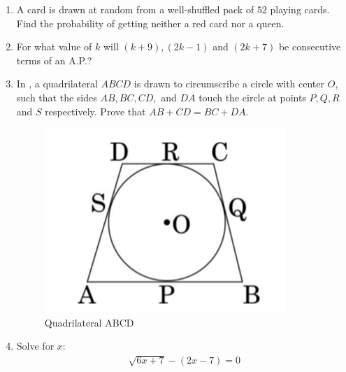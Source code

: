 \documentclass{article}
\begin{document}
\begin{enumerate}
    \item A card is drawn at random from a well-shuffled pack of $52$ playing cards. Find the probability of getting neither a red card nor a queen.
    
    \item For what value of $k$ will $(k+9), (2k-1)$ and $( 2k+7)$ be consecutive terms of an A.P.?
    
    \item In , a quadrilateral $ABCD$ is drawn to circumscribe a circle with center $O$, such that the sides $AB, BC, CD,$ and $DA$ touch the circle at points $P, Q, R$ and $S$ respectively. Prove that $AB + CD = BC + DA$.
    \begin{figure}[H]
        \includegraphics[width=\columnwidth]{./quadrilateralABCD.jpg}
        \caption{Quadrilateral ABCD}
        \label{fig:quadrilateralABCD}
    \end{figure}

    \item Solve for $x$:
    \begin{align}
        \sqrt{6x + 7} - (2x - 7) = 0
    \end{align}


\end{enumerate}
\end{document}
